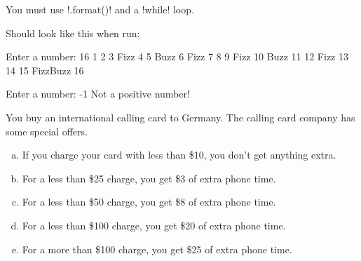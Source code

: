 \documentclass[11pt]{cselabheader}
\begin{document}
{\begin{ex}[fizzbuzz.py]
  You must use \pythoninline!.format()! and a \pythoninline!while! loop.

  Should look like this when run:

  \begin{verbatimcode}
Enter a number: 16
1
2
3 Fizz
4
5 Buzz
6 Fizz
7
8
9 Fizz
10 Buzz
11
12 Fizz
13
14
15 FizzBuzz
16
  \end{verbatimcode}

  \begin{verbatimcode}
Enter a number: -1
Not a positive number!
  \end{verbatimcode}
\end{ex}



%
%
%

\begin{ex}[calls.py] You buy an international calling card to Germany. The
  calling card company has some special offers.

    \begin{enumerate}[(a)]
      \item If you charge your card with less than \$10, you don't get anything
        extra.
      \item For a less than \$25 charge, you get \$3 of extra phone time.
      \item For a less than \$50 charge, you get \$8 of extra phone time.
      \item For a less than \$100 charge, you get \$20 of extra phone time.
      \item For a more than \$100 charge, you get \$25 of extra phone time.
    \end{enumerate}


\end{ex}}
\end{document}
